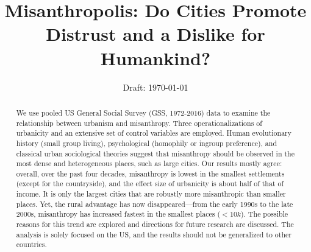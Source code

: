 \documentclass[11pt, letterpaper]{article}
\date{Draft: {}\today}
\title{  %
  Misanthropolis: Do Cities Promote Distrust and a Dislike for Humankind?
}
\author{
}
\begin{document}


\maketitle
\vspace{-.4in}
\begin{center}

\end{center}


\begin{abstract}
\noindent 
We use pooled US General Social Survey (GSS, 1972-2016) data to examine 
the relationship between urbanism and misanthropy. Three operationalizations of urbanicity and an extensive set of control variables are employed. 
Human evolutionary history (small group living),  psychological
(homophily or ingroup preference), and classical urban sociological theories  
suggest that misanthropy should be observed in the most dense and
heterogeneous places, such as large cities. Our results mostly agree: overall, over
the past four decades, misanthropy is lowest in the smallest settlements (except for the countryside), and the effect size of urbanicity is about half of that of
 income. It is only the largest cities that are robustly more misanthropic than smaller places.
Yet, the rural advantage has now disappeared---from the early 1990s to the late 2000s, misanthropy has
increased fastest in the smallest places ($<10k$). The possible reasons for this trend are explored and directions for future research are discussed. The analysis is solely focused on the US, and the results should not be generalized to other countries.
\end{abstract}

\end{document}

